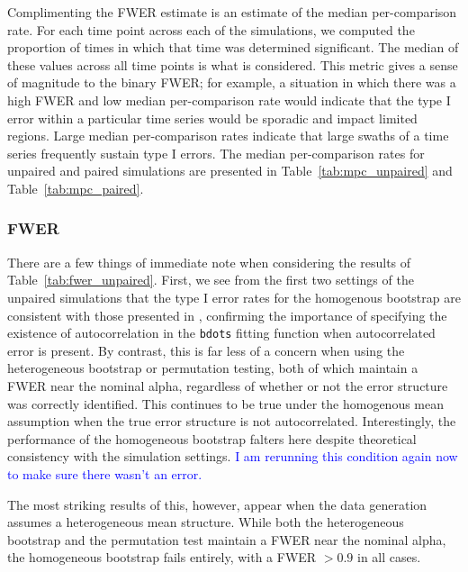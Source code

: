 \documentclass{article}
\newcommand{\xt}{\texttt}
\providecommand{\cn}[1]{\textcolor{blue}{#1}}
\begin{document}
Complimenting the FWER estimate is an estimate of the median per-comparison rate. For each time point across each of the simulations, we computed the proportion of times in which that time was determined significant. The median of these values across all time points is what is considered. This metric gives a sense of magnitude to the binary FWER; for example, a situation in which there was a high FWER and low median per-comparison rate would indicate that the type I error within a particular time series would be sporadic and impact limited regions. Large median per-comparison rates indicate that large swaths of a time series frequently sustain type I errors. The median per-comparison rates for unpaired and paired simulations are presented in Table~\ref{tab:mpc_unpaired} and Table~\ref{tab:mpc_paired}.


\subsubsection{FWER}



There are a few things of immediate note when considering the results of Table~\ref{tab:fwer_unpaired}. First, we see from the first two settings of the unpaired simulations that the type I error rates for the homogenous bootstrap are consistent with those presented in \cite{oleson2017detecting}, confirming the importance of specifying the existence of autocorrelation in the \xt{bdots} fitting function when autocorrelated error is present. By contrast, this is far less of a concern when using the heterogeneous bootstrap or permutation testing, both of which maintain a FWER near the nominal alpha, regardless of whether or not the error structure was correctly identified. This continues to be true under the homogenous mean assumption when the true error structure is not autocorrelated. Interestingly, the performance of the homogeneous bootstrap falters here despite theoretical consistency with the simulation settings. \cn{I am rerunning this condition again now to make sure there wasn't an error.}

The most striking results of this, however, appear when the data generation assumes a heterogeneous mean structure. While both the heterogeneous bootstrap and the permutation test maintain a FWER near the nominal alpha, the homogeneous bootstrap fails entirely, with a FWER $> 0.9$ in all cases.
\end{document}
